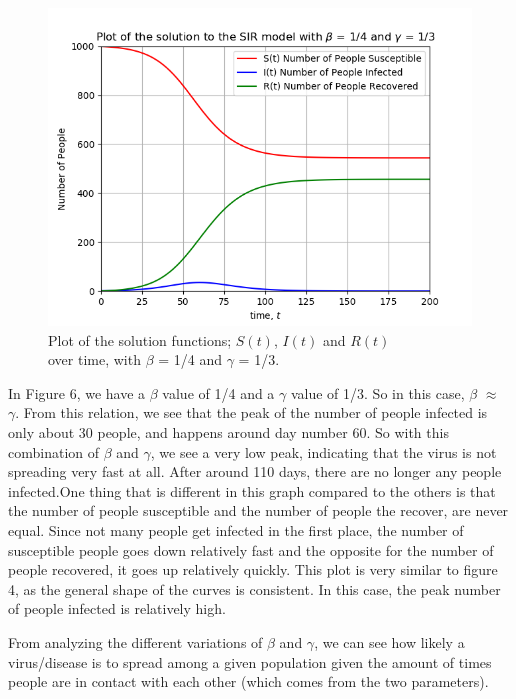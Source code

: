 \documentclass{article}
\begin{document}
\begin{figure}[!htb]
  \centering
  \includegraphics[width=1\linewidth]{Q2_plot4.png}
  \caption{Plot of the solution functions; $S(t)$, $I(t)$ and $R(t)$ \\ over time, with $\beta$ = 1/4 and $\gamma$ = 1/3.}
  \label{fig:Q2_plot4.png}
\end{figure}

In Figure 6, we have a $\beta$ value of 1/4 and a $\gamma$ value of 1/3. 
So in this case, $\beta$ $\approx$ $\gamma$.
From this relation, we see that the peak of the number of people infected is only about 30 people, and happens around day number 60.
So with this combination of $\beta$ and $\gamma$, we see a very low peak, indicating that the virus is not spreading very fast at all.
After around 110 days, there are no longer any people infected.One thing that is different in this graph compared to the others is that the number of people susceptible and the number of people the recover, are never equal. Since not many people get infected in the first place, the number of susceptible people goes down relatively fast and the opposite for the number of people recovered, it goes up relatively quickly.
This plot is very similar to figure 4, as the general shape of the curves is consistent.
In this case, the peak number of people infected is relatively high.

From analyzing the different variations of $\beta$ and $\gamma$, we can see how likely a virus/disease is to spread among a given population given the amount of times people are in contact with each other (which comes from the two parameters).
\end{document}
